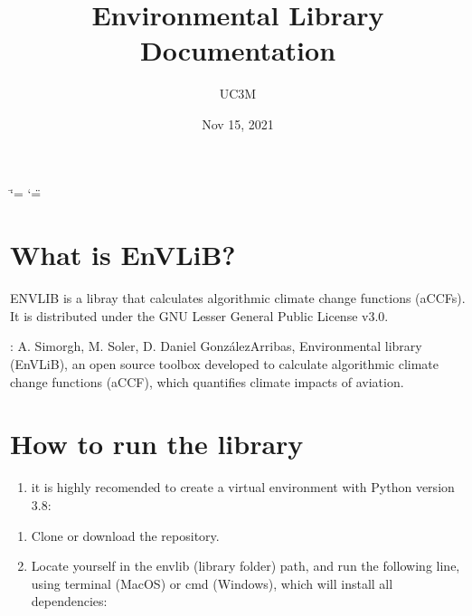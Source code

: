 \documentclass[a4paper,11pt,english]{sphinxmanual}
\title{Environmental Library Documentation}
\date{Nov 15, 2021}
\author{UC3M}
\begin{document}
\ifdefined\shorthandoff
  \ifnum\catcode`\=\string=\active\shorthandoff{=}\fi
  \ifnum\catcode`\"=\active{}\fi
\fi

\pagestyle{empty}
\sphinxmaketitle
\pagestyle{plain}
\sphinxtableofcontents
\pagestyle{normal}
\label{\detokenize{index::doc}}



\chapter{What is EnVLiB?}
\label{\detokenize{index:what-is-envlib}}
ENVLIB is a libray that calculates algorithmic climate change functions (aCCFs).
It is distributed under the GNU Lesser General Public License v3.0.

: A. Simorgh, M. Soler, D. Daniel González\sphinxhyphen{}Arribas, Environmental library (EnVLiB), an open source toolbox developed to calculate algorithmic climate change functions (aCCF), which quantifies climate impacts of aviation.


\chapter{How to run the library}
\label{\detokenize{index:how-to-run-the-library}}\begin{enumerate}
%
\setcounter{enumi}{-1}
\item {} 
it is highly recomended to create a virtual environment with Python version 3.8:

\end{enumerate}

\begin{sphinxVerbatim}[commandchars=\\\{\}]
    
  
\end{sphinxVerbatim}
\begin{enumerate}
%
\item {} 
Clone or download the repository.

\item {} 
Locate yourself in the envlib (library folder) path, and run the following line, using terminal (MacOS) or cmd (Windows), which will install all dependencies:

\end{enumerate}
\end{document}
